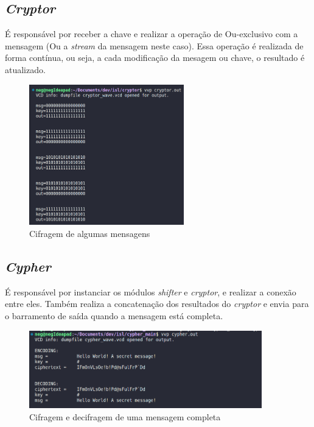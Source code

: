 \documentclass{article}
\begin{document}
\subsection{\emph{Cryptor}}
É responsável por receber a chave e realizar a operação de Ou-exclusivo com a mensagem (Ou a \emph{stream} da mensagem neste caso). Essa operação é realizada de forma contínua, ou seja, a cada modificação da mesagem ou chave, o resultado é atualizado.

\begin{figure}[H]
    \centering
    \includegraphics[width=0.6\textwidth]{images/cryptor_log.png}
    \caption{Cifragem de algumas mensagens}
    \label{fig:cryptor}
\end{figure}

\subsection{\emph{Cypher}}
É responsável por instanciar os módulos \emph{shifter} e \emph{cryptor}, e realizar a conexão entre eles. Também realiza a concatenação dos resultados do \emph{cryptor} e envia para o barramento de saída quando a mensagem está completa.

\begin{figure}[H]
    \centering
    \includegraphics[width=0.9\textwidth]{images/cypher_log.png}
    \caption{Cifragem e decifragem de uma mensagem completa}
    \label{fig:cypher_log}
\end{figure}
\end{document}
